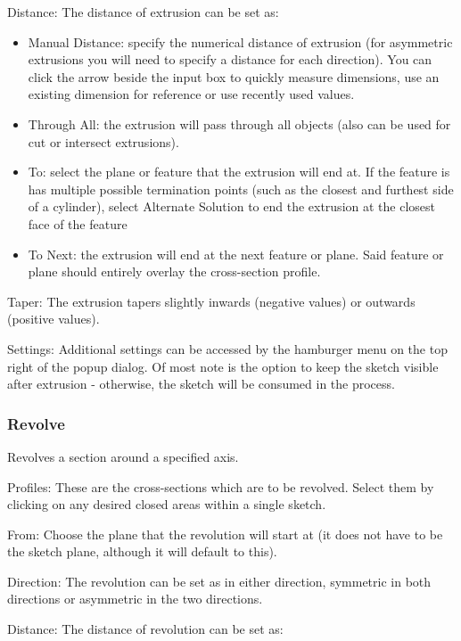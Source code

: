 Distance:
The distance of extrusion can be set as:

\begin{itemize}
    \item Manual Distance: specify the numerical distance of extrusion (for asymmetric extrusions you will need to specify a distance for each direction). You can click the arrow beside the input box to quickly measure dimensions, use an existing dimension for reference or use recently used values.
    \item Through All: the extrusion will pass through all objects (also can be used for cut or intersect extrusions).
    \item To: select the plane or feature that the extrusion will end at. If the feature is has multiple possible termination points (such as the closest and furthest side of a cylinder), select Alternate Solution to end the extrusion at the closest face of the feature
    \item To Next: the extrusion will end at the next feature or plane. Said feature or plane should entirely overlay the cross-section profile.
\end{itemize}

Taper:
The extrusion tapers slightly inwards (negative values) or outwards (positive values).

Settings:
Additional settings can be accessed by the hamburger menu on the top right of the popup dialog. Of most note is the option to keep the sketch visible after extrusion - otherwise, the sketch will be consumed in the process.

\subsubsection{Revolve}
Revolves a section around a specified axis.

Profiles:
These are the cross-sections which are to be revolved. Select them by clicking on any desired closed areas within a single sketch.

From:
Choose the plane that the revolution will start at (it does not have to be the sketch plane, although it will default to this).

Direction:
The revolution can be set as in either direction, symmetric in both directions or asymmetric in the two directions.

Distance:
The distance of revolution can be set as:

